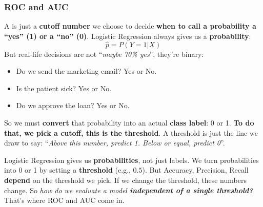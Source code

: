 \subsubsection{ROC and AUC}

A  is just a \textbf{cutoff number} we choose to decide \textbf{when to call a probability a ``yes'' (1) or a ``no'' (0)}. Logistic Regression always gives us a \textbf{probability}:
\begin{equation*}
    \hat{p} = P\left(Y = 1 | X\right)
\end{equation*}
But real-life decisions are not ``\emph{maybe 70\% yes}'', they're binary:
\begin{itemize}
    \item Do we send the marketing email? Yes or No.
    \item Is the patient sick? Yes or No.
    \item Do we approve the loan? Yes or No.
\end{itemize}
So we must \textbf{convert} that probability into an actual \textbf{class label}: 0 or 1. \textbf{To do that, we pick a cutoff, this is the threshold}. A threshold is just the line we draw to say: ``\emph{Above this number, predict 1. Below or equal, predict 0}''.

\highspace
Logistic Regression gives us \textbf{probabilities}, not just labels. We turn probabilities into 0 or 1 by setting a \textbf{threshold} (e.g., $0.5$). But Accuracy, Precision, Recall \textbf{depend} on the threshold we pick. If we change the threshold, these numbers change. So \emph{how do we evaluate a model \textbf{independent of a single threshold?}} That's where ROC and AUC come in.

